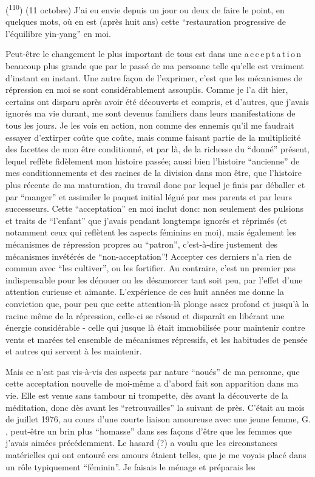 (\textsuperscript{110}) (11 octobre) J'ai eu envie depuis un jour ou deux de faire le point, en quelques mots, où en est (après huit ans) cette ``restauration progressive de l'équilibre yin-yang'' en moi.

Peut-être le changement le plus important de tous est dans une a\,c\,c\,e\,p\,t\,a\,t\,i\,o\,n beaucoup plus grande que par le passé de ma personne telle qu'elle est vraiment d'instant en instant. Une autre façon de l'exprimer, c'est que les mécanismes de répression en moi se sont considérablement assouplis. Comme je l'a dit hier, certains ont disparu après avoir été découverts et compris, et d'autres, que j'avais ignorés ma vie durant, me sont devenus familiers dans leurs manifestations de tous les jours. Je les vois en action, non comme des ennemis qu'il me faudrait essayer d'extirper coûte que coûte, mais comme faisant partie de la multiplicité des facettes de mon être conditionné, et par là, de la richesse du ``donné'' présent, lequel reflète fidèlement mon histoire passée; aussi bien l'histoire ``ancienne'' de mes conditionnements et des racines de la division dans mon être, que l'histoire plus récente de ma maturation, du travail donc par lequel je finis par déballer et par ``manger'' et assimiler le paquet initial légué par mes parents et par leurs successeurs. Cette ``acceptation'' en moi inclut donc: non seulement des pulsions et traits de ``l'enfant'' que j'avais pendant longtemps ignorés et réprimés (et notamment ceux qui reflètent les aspects féminins en moi), mais également les mécanismes de répression propres au ``patron'', c'est-à-dire justement des mécanismes invétérés de ``non-acceptation''! Accepter ces derniers n'a rien de commun avec ``les cultiver'', ou les fortifier. Au contraire, c'est un premier pas indispensable pour les dénouer ou les désamorcer tant soit peu, par l'effet d'une attention curieuse et aimante. L'expérience de ces huit années me donne la conviction que, pour peu que cette attention-là plonge assez profond et jusqu'à la racine même de la répression, celle-ci se résoud et disparaît en libérant une énergie considérable - celle qui jusque là était immobilisée pour maintenir contre vents et marées tel ensemble de mécanismes répressifs, et les habitudes de pensée et autres qui servent à les maintenir.

Mais ce n'est pas vis-à-vis des aspects par nature ``noués'' de ma personne, que cette acceptation nouvelle de moi-même a d'abord fait son apparition dans ma vie. Elle est venue sans tambour ni trompette, dès avant la découverte de la méditation, donc dès avant les ``retrouvailles'' la suivant de près. C'était au mois de juillet 1976, au cours d'une courte liaison amoureuse avec une jeune femme, G. , peut-être un brin plus ``homasse'' dans ses façons d'être que les femmes que j'avais aimées précédemment. Le hasard (?) a voulu que les circonstances matérielles qui ont entouré ces amours étaient telles, que je me voyais placé\margin{\unsure{-}} dans un rôle typiquement ``féminin''. Je faisais le ménage et préparais les
